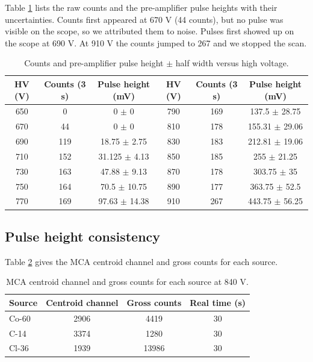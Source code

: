 \documentclass[12pt]{article}
\begin{document}
Table \ref{tab:rawcc} lists the raw counts and the pre-amplifier pulse heights with their uncertainties. Counts first appeared at 670 V (44 counts), but no pulse was visible on the scope, so we attributed them to noise. Pulses first showed up on the scope at 690 V. At 910 V the counts jumped to 267 and we stopped the scan.

\begin{table}[!htbp]
\centering\small\setlength{\tabcolsep}{3pt}
\begin{tabular}{ccc|ccc}
\toprule
\textbf{HV (V)} & \textbf{Counts (3 s)} & \textbf{Pulse height (mV)} & \textbf{HV (V)} & \textbf{Counts (3 s)} & \textbf{Pulse height (mV)} \\
\midrule
650 & 0 & 0 $\pm$ 0 & 790 & 169 & 137.5 $\pm$ 28.75 \\
670 & 44 & 0 $\pm$ 0 & 810 & 178 & 155.31 $\pm$ 29.06 \\
690 & 119 & 18.75 $\pm$ 2.75 & 830 & 183 & 212.81 $\pm$ 19.06 \\
710 & 152 & 31.125 $\pm$ 4.13 & 850 & 185 & 255 $\pm$ 21.25 \\
730 & 163 & 47.88 $\pm$ 9.13 & 870 & 178 & 303.75 $\pm$ 35 \\
750 & 164 & 70.5 $\pm$ 10.75 & 890 & 177 & 363.75 $\pm$ 52.5 \\
770 & 169 & 97.63 $\pm$ 14.38 & 910 & 267 & 443.75 $\pm$ 56.25 \\
\bottomrule
\end{tabular}
\caption{Counts and pre-amplifier pulse height $\pm$ half width versus high voltage.}
\label{tab:rawcc}
\end{table}

\subsection{Pulse height consistency}

Table \ref{tab:rawcons} gives the MCA centroid channel and gross counts for each source.

\begin{table}[!htbp]
\centering\small
\begin{tabular}{lccc}
\toprule
\textbf{Source} & \textbf{Centroid channel} & \textbf{Gross counts} & \textbf{Real time (s)} \\
\midrule
Co-60 & 2906 & 4419 & 30 \\
C-14 & 3374 & 1280 & 30 \\
Cl-36 & 1939 & 13986 & 30 \\
\bottomrule
\end{tabular}
\caption{MCA centroid channel and gross counts for each source at 840 V.}
\label{tab:rawcons}
\end{table}
\end{document}
